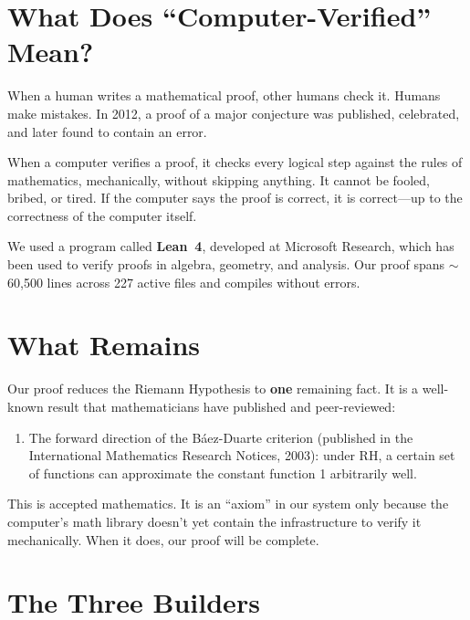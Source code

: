 \documentclass[11pt,a4paper]{article}
\begin{document}
\section{What Does ``Computer-Verified'' Mean?}

When a human writes a mathematical proof, other humans check it.
Humans make mistakes. In 2012, a proof of a major conjecture was
published, celebrated, and later found to contain an error.

When a computer verifies a proof, it checks every logical step
against the rules of mathematics, mechanically, without skipping
anything. It cannot be fooled, bribed, or tired. If the computer
says the proof is correct, it is correct---up to the correctness
of the computer itself.

We used a program called \textbf{Lean~4}, developed at Microsoft
Research, which has been used to verify proofs in algebra, geometry,
and analysis. Our proof spans $\sim$60{,}500 lines across 227 active
files and compiles without errors.

\section{What Remains}

Our proof reduces the Riemann Hypothesis to \textbf{one} remaining
fact. It is a well-known result that mathematicians have
published and peer-reviewed:

\begin{enumerate}
  \item The forward direction of the B\'aez-Duarte criterion
    (published in the International Mathematics Research Notices,
    2003): under RH, a certain set of functions can approximate
    the constant function 1 arbitrarily well.
\end{enumerate}

This is accepted mathematics. It is an ``axiom'' in our
system only because the computer's math library doesn't yet contain
the infrastructure to verify it mechanically. When it does, our
proof will be complete.

\section{The Three Builders}
\end{document}
